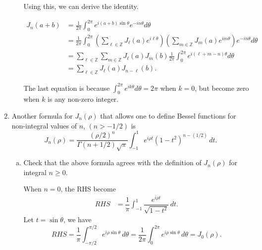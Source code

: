 \documentclass{article}
\begin{document}
\begin{enumerate}
\begin{enumerate}[(a)]
\begin{solution}
            Using this, we can derive the identity.

            \begin{align*}
                J_n(a+b) &= \frac1{2\pi} \int_0^{2\pi} e^{i(a+b)\sin\theta} e^{-in\theta} d\theta \\
                &= \frac1{2\pi} \int_0^{2\pi} \left(\sum_{\ell\in\mathbb Z} J_\ell (a) e^{i\ell\theta}\right)
                    \left(\sum_{m\in\mathbb Z} J_m (a) e^{im\theta}\right) e^{-in\theta} d\theta\\
                    &= \sum_{\ell\in\mathbb Z}\sum_{m\in\mathbb Z} J_\ell(a) J_m(b) \frac1{2\pi} \int_0^{2\pi} e^{i(\ell+m-n)\theta} d\theta\\
                    &= \sum_{\ell\in\mathbb Z} J_{\ell}(a) J_{n-\ell}(b). 
            \end{align*}
            
            The last equation is because $\int_0^{2\pi} e^{ik\theta} d\theta=2\pi$ when $k=0$, but become zero when $k$ is any non-zero integer.
        \end{solution}
        
    \end{enumerate}

    \item Another formula for $J_n(\rho)$ that allows one to define Bessel functions for non-integral values of $n$, $(n > -1/2)$ is 
    $$J_n(\rho) = \dfrac{(\rho/2)^n}{\Gamma(n+1/2)\sqrt\pi} \int_{-1}^1 e^{i\rho t} (1-t^2)^{n-(1/2)}\, dt.$$

    \begin{enumerate}[(a)]
        \item Check that the above formula agrees with the definition of $J_n(\rho)$ for integral $n\geq 0$. 
        
        \begin{solution}
            When $n=0$, the RHS become
            \begin{align*}
                RHS&= \dfrac1\pi \int_{-1}^1 \dfrac{e^{i\rho t}}{\sqrt{1-t^2}} \, dt.
            \end{align*}
            Let $t=\sin\theta$, we have
            $$RHS = \dfrac1\pi \int_{-\pi/2}^{\pi/2} e^{i\rho \sin\theta} \, d\theta 
            = \dfrac1{2\pi} \int_0^{2\pi} e^{i\rho \sin\theta} \, d\theta = J_0(\rho). $$
            

\end{solution}
\end{enumerate}
\end{enumerate}
\end{document}
